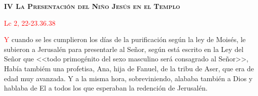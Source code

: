 \begin{center}
    \textbf{\textsc{IV La Presentación del Niño Jesús en el Templo}}

    \textcolor{red}{Lc 2, 22-23.36.38}
\end{center}

\lettrine[lines=2]{\textcolor{red}{Y}}\space{} cuando se les cumplieron los días de la purificación según la ley de Moisés, le subieron a Jerusalén para presentarle al Señor,
según está escrito en la Ley del Señor que <<todo primogénito del sexo masculino será consagrado al Señor>>, Había tambiém una profetisa, Ana, hija de Fanuel, de la tribu
de Aser, que era de edad muy avanzada. Y a la misma hora, sobreviniendo, alababa también a Dios y hablaba de El a todos los que esperaban la redención de Jerusalén.